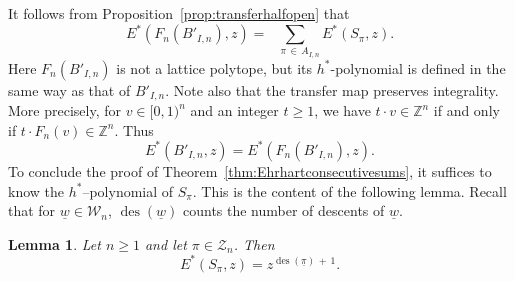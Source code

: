 \documentclass[11pt]{article}
\newtheorem{lemm}[theo]{Lemma}
\theoremstyle{definition}
\numberwithin{equation}{section}
\numberwithin{figure}{section}
\numberwithin{table}{section}
\DeclareMathOperator{\des}{des}
\newcommand{\calZ}{\mathcal Z}
\newcommand{\calW}{\mathcal W}
\begin{document}
It follows from Proposition~\ref{prop:transferhalfopen} that
\[
E^*(F_n(B'_{I,n}),z)=\!\!\!\!\sum_{\quad\pi\,\in\,A_{I,n}} E^*(S_\pi,z).
\]
Here $F_n(B'_{I,n})$ is not a lattice polytope, but its $h^*$-polynomial is defined in the same way as that of $B'_{I,n}$. Note also that the transfer map preserves integrality. More precisely, for $v \in [0,1)^n$ and an integer $t\geq1$, we have $ t\cdot v \in \mathbb{Z}^n$ if and only if $ t\cdot F_n(v) \in \mathbb{Z}^n$. Thus
\[
E^*(B'_{I,n},z)=E^*(F_n(B'_{I,n}),z).
\]
To conclude the proof of Theorem~\ref{thm:Ehrhartconsecutivesums}, it suffices to know the $h^*$--polynomial of $S_\pi$. This is the content of the following lemma. Recall that for $\underline{w} \in \calW_n$, $\des(\underline{w})$ counts the number of descents of $\underline{w}$.

\begin{lemm}\label{lem:HJV}
Let $n\geq 1$ and let $\pi\in\calZ_n$. Then
\begin{equation}
E^*(S_\pi, z) = z^{\des(\underline{\pi})\,+\,1}.
\end{equation}
\end{lemm}
\end{document}
